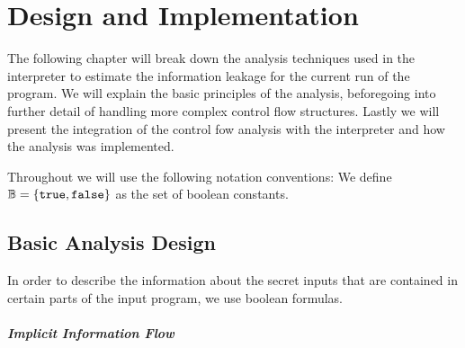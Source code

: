 \chapter{Design and Implementation}\label{sec:impl}

The following chapter will break down the analysis techniques used in the interpreter to estimate the information leakage for the current run of the program. We will explain the basic principles of the analysis, beforegoing into further detail of handling more complex control flow structures. Lastly we will present the integration of the control fow analysis with the interpreter and how the analysis was implemented.

Throughout we will use the following notation conventions:
We define $\mathbb{B} = \{ \mathtt{true}, \mathtt{false} \}$ as the set of boolean constants.


\section{Basic Analysis Design}


In order to describe the information about the secret inputs that are contained in certain parts of the input program, we use boolean formulas.


\paragraph{Implicit Information Flow}

